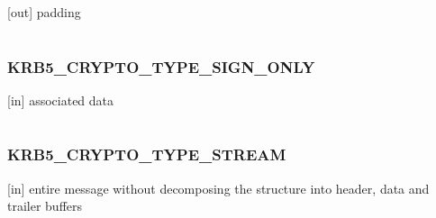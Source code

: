 \documentclass[letterpaper,10pt,english]{sphinxmanual}
\begin{document}
{[}out{]} padding

\begin{tabulary}{\linewidth}{|L|L|}
\hline

 & 
\\\hline
\end{tabulary}



\subsubsection{KRB5\_CRYPTO\_TYPE\_SIGN\_ONLY}
\label{appdev/refs/macros/KRB5_CRYPTO_TYPE_SIGN_ONLY:krb5-crypto-type-sign-only}\label{appdev/refs/macros/KRB5_CRYPTO_TYPE_SIGN_ONLY:krb5-crypto-type-sign-only-data}\label{appdev/refs/macros/KRB5_CRYPTO_TYPE_SIGN_ONLY::doc}

\begin{fulllineitems}
\label{appdev/refs/macros/KRB5_CRYPTO_TYPE_SIGN_ONLY:KRB5_CRYPTO_TYPE_SIGN_ONLY}
\end{fulllineitems}


{[}in{]} associated data

\begin{tabulary}{\linewidth}{|L|L|}
\hline

 & 
\\\hline
\end{tabulary}



\subsubsection{KRB5\_CRYPTO\_TYPE\_STREAM}
\label{appdev/refs/macros/KRB5_CRYPTO_TYPE_STREAM:krb5-crypto-type-stream-data}\label{appdev/refs/macros/KRB5_CRYPTO_TYPE_STREAM::doc}\label{appdev/refs/macros/KRB5_CRYPTO_TYPE_STREAM:krb5-crypto-type-stream}

\begin{fulllineitems}
\label{appdev/refs/macros/KRB5_CRYPTO_TYPE_STREAM:KRB5_CRYPTO_TYPE_STREAM}
\end{fulllineitems}


{[}in{]} entire message without decomposing the structure into header, data and trailer buffers
\end{document}
